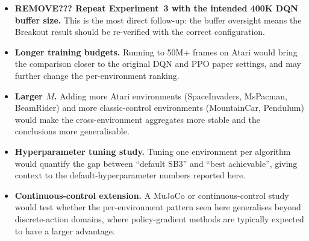 \begin{itemize}
  \item \textbf{ REMOVE??? Repeat Experiment~3 with the intended 400K DQN buffer
  size.} This is the most direct follow-up: the buffer oversight means
  the Breakout result should be re-verified with the correct
  configuration.
  \item \textbf{Longer training budgets.} Running to 50M+ frames on
  Atari would bring the comparison closer to the original DQN and PPO
  paper settings, and may further change the per-environment ranking.
  \item \textbf{Larger $M$.} Adding more Atari environments
  (SpaceInvaders, MsPacman, BeamRider) and more classic-control
  environments (MountainCar, Pendulum) would make the cross-environment
  aggregates more stable and the conclusions more generalisable.
  \item \textbf{Hyperparameter tuning study.} Tuning one environment
  per algorithm would quantify the gap between ``default SB3'' and
  ``best achievable'', giving context to the default-hyperparameter
  numbers reported here.
  \item \textbf{Continuous-control extension.} A MuJoCo or
  continuous-control study would test whether the per-environment
  pattern seen here generalises beyond discrete-action domains, where
  policy-gradient methods are typically expected to have a larger
  advantage.
\end{itemize}

